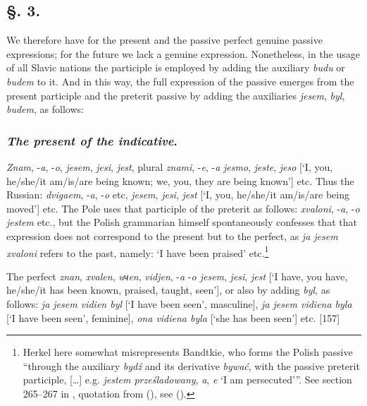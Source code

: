 \subsection*{\hspace*{\fill}§. 3.\hspace*{\fill}}

We therefore have for the present and the passive perfect genuine passive expressions; for the future we lack a genuine expression. Nonetheless, in the usage of all Slavic nations the participle is employed by adding the auxiliary \textit{budu} or \textit{budem} to it. And in this way, the full expression of the passive emerges from the present participle and the preterit passive by adding the auxiliaries \textit{jesem}, \textit{byl}, \textit{budem}, as follows:

\subsubsection*{\textit{The present of the indicative}.}

\textit{Znam}, -\textit{a}, -\textit{o}, \textit{jesem}, \textit{jesi}, \textit{jest}, plural \textit{znami}, -\textit{e}, -\textit{a} \textit{jesmo}, \textit{jeste}, \textit{jeso} [‘I, you, he/she/it am/is/are being known; we, you, they are being known’] etc. Thus the Russian: \textit{dvigaem}, -\textit{a}, -\textit{o} etc, \textit{jesem}, \textit{jesi}, \textit{jest} [‘I, you, he/she/it am/is/are being moved’] etc. The Pole uses that participle of the preterit as follows: \textit{xvaloni}, -\textit{a}, -\textit{o} \textit{jestem} etc., but the Polish grammarian himself spontaneously confesses that that expression does not correspond to the present but to the perfect, as \textit{ja jesem xvaloni} refers to the past, namely: ‘I have been praised’ etc.\footnote{Herkel here somewhat misrepresents Bandtkie, who forms the Polish passive “through the auxiliary \textit{bydź} and its derivative \textit{bywać}, with the passive preterit participle, […] e.g. \textit{jestem prześladowany}, \textit{a}, \textit{e} ‘I am persecuted’”. See section 265--267 in \citet{bandtkie_polnische_1824}, quotation from (\citeyear[269]{bandtkie_polnische_1824}), see (\citeyear[269--271]{bandtkie_polnische_1824}).}

The perfect \textit{znan}, \textit{xvalen}, \textit{uчen}, \textit{vidjen}, -\textit{a} -\textit{o jesem}, \textit{jesi}, \textit{jest} [‘I have, you have, he/she/it has been known, praised, taught, seen’], or also by adding \textit{byl}, as follows: \textit{ja jesem vidien byl} [‘I have been seen’, masculine], \textit{ja jesem vidiena byla} [‘I have been seen’, feminine], \textit{ona vidiena byla} [‘she has been seen’] etc. [157]

